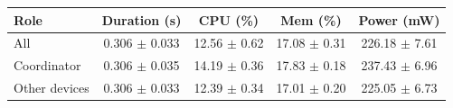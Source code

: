 \begin{tabular}{lcccc}
\hline
\textbf{Role} & \textbf{Duration (s)} & \textbf{CPU (\%)} & \textbf{Mem (\%)} & \textbf{Power (mW)} \\
\hline
All & 0.306 $\pm$ 0.033 & 12.56 $\pm$ 0.62 & 17.08 $\pm$ 0.31 & 226.18 $\pm$ 7.61 \\
Coordinator & 0.306 $\pm$ 0.035 & 14.19 $\pm$ 0.36 & 17.83 $\pm$ 0.18 & 237.43 $\pm$ 6.96 \\
Other devices & 0.306 $\pm$ 0.033 & 12.39 $\pm$ 0.34 & 17.01 $\pm$ 0.20 & 225.05 $\pm$ 6.73 \\
\hline
\end{tabular}

